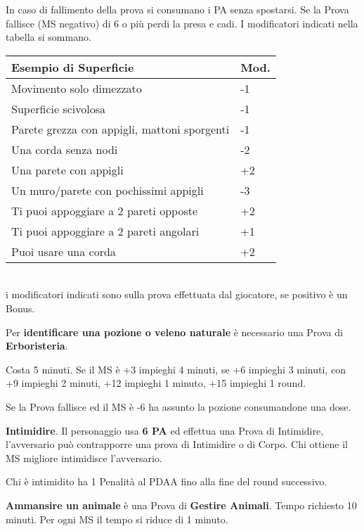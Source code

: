 \documentclass[12pt,a4paper,twoside,openany]{book}
\begin{document}
\begin{multicols}{2}
In caso di fallimento della prova si consumano i PA senza spostarsi. Se la Prova fallisce (MS negativo) di 6 o più perdi la presa e cadi. I modificatori indicati nella tabella si sommano.\\

\begin{tabularx}{0.45\textwidth}{Xl}
	\textbf{Esempio di Superficie} & Mod.\\
	\toprule
	Movimento solo dimezzato & -1\\
	Superficie scivolosa&-1\\
	Parete grezza con appigli, mattoni sporgenti&-1\\
	Una corda senza nodi&-2\\
	Una parete con appigli &+2\\
	Un muro/parete con pochissimi appigli&-3\\
	Ti puoi appoggiare a 2 pareti opposte&+2\\
	Ti puoi appoggiare a 2 pareti angolari&+1\\
	Puoi usare una corda&+2\\
\end{tabularx}\\

i modificatori indicati sono sulla prova effettuata dal giocatore, se positivo è un Bonus.

\medskip

Per \textbf{identificare una pozione o veleno naturale} è necessario una Prova di \textbf{Erboristeria}.

Costa 5 minuti. Se il MS è +3 impieghi 4 minuti, se +6 impieghi 3 minuti, con +9 impieghi 2 minuti, +12 impieghi 1 minuto, +15 impieghi 1 round.

Se la Prova fallisce ed il MS è -6 ha assunto la pozione consumandone una dose.

\medskip

\textbf{Intimidire}. Il personaggio usa \textbf{6 PA} ed effettua una Prova di Intimidire, l'avversario può contrapporre una prova di Intimidire o di Corpo. Chi ottiene il MS migliore intimidisce l'avversario.

Chi è intimidito ha 1 Penalità al PDAA fino alla fine del round successivo.

\medskip

\textbf{Ammansire un animale} è una Prova di \textbf{Gestire Animali}. Tempo richiesto 10 minuti. Per ogni MS il tempo si riduce di 1 minuto.


\end{multicols}
\end{document}
